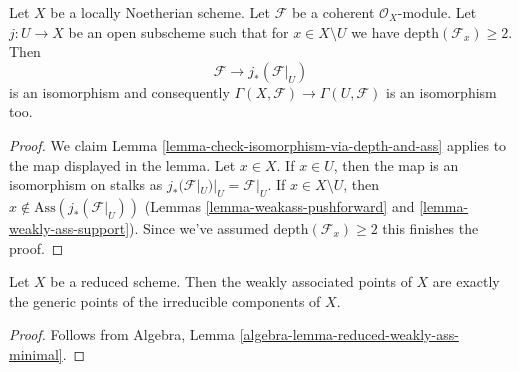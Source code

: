 \begin{lemma}
\label{lemma-depth-2-hartog}
Let $X$ be a locally Noetherian scheme. Let $\mathcal{F}$
be a coherent $\mathcal{O}_X$-module. Let $j : U \to X$
be an open subscheme such that for $x \in X \setminus U$
we have $\text{depth}(\mathcal{F}_x) \geq 2$. Then
$$
\mathcal{F} \longrightarrow j_*(\mathcal{F}|_U)
$$
is an isomorphism and consequently
$\Gamma(X, \mathcal{F}) \to \Gamma(U, \mathcal{F})$
is an isomorphism too.
\end{lemma}

\begin{proof}
We claim Lemma \ref{lemma-check-isomorphism-via-depth-and-ass}
applies to the map displayed in the lemma.
Let $x \in X$. If $x \in U$, then the map is an
isomorphism on stalks as $j_*(\mathcal{F}|_U)|_U = \mathcal{F}|_U$.
If $x \in X \setminus U$, then $x \not \in \text{Ass}(j_*(\mathcal{F}|_U))$
(Lemmas \ref{lemma-weakass-pushforward} and \ref{lemma-weakly-ass-support}).
Since we've assumed $\text{depth}(\mathcal{F}_x) \geq 2$
this finishes the proof.
\end{proof}

\begin{lemma}
\label{lemma-weakass-reduced}
Let $X$ be a reduced scheme. Then the weakly associated points of $X$
are exactly the generic points of the irreducible components of $X$.
\end{lemma}

\begin{proof}
Follows from Algebra, Lemma \ref{algebra-lemma-reduced-weakly-ass-minimal}.
\end{proof}



